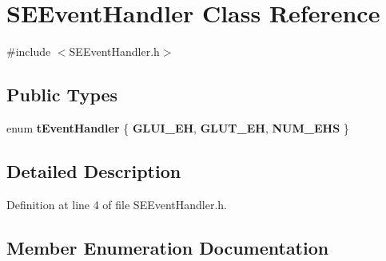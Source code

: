 \section{S\+E\+Event\+Handler Class Reference}
\label{class_s_e_event_handler}


{\ttfamily \#include $<$S\+E\+Event\+Handler.\+h$>$}

\subsection*{Public Types}
\begin{DoxyCompactItemize}
\item 
enum {\bf t\+Event\+Handler} \{ {\bf G\+L\+U\+I\+\_\+\+E\+H}, 
{\bf G\+L\+U\+T\+\_\+\+E\+H}, 
{\bf N\+U\+M\+\_\+\+E\+H\+S}
 \}
\end{DoxyCompactItemize}


\subsection{Detailed Description}


Definition at line 4 of file S\+E\+Event\+Handler.\+h.



\subsection{Member Enumeration Documentation}
